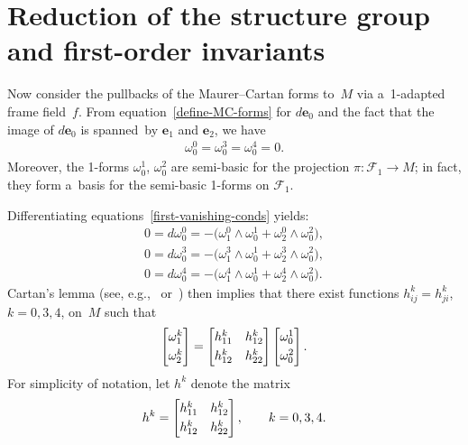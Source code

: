 \documentclass[pdftex]{sigma}
\numberwithin{equation}{section}
\theoremstyle{definition}
\begin{document}
\section{Reduction of the structure group and f\/irst-order invariants}\label{moving-frames-sec}

Now consider the pullbacks of the Maurer--Cartan forms to~$M$ via a~1-adapted frame f\/ield~$f$.
From equation~\eqref{define-MC-forms} for $d\mathbf{e}_0$ and the fact that the image of $d\mathbf{e}_0$ is spanned~by
$\mathbf{e}_1$ and $\mathbf{e}_2$, we have
\begin{gather}
\omega^0_0 = \omega^3_0 = \omega^4_0 = 0.
\label{first-vanishing-conds}
\end{gather}
Moreover, the 1-forms $\omega^1_0$, $\omega^2_0$ are semi-basic for the projection $\pi:\mathcal{F}_1 \to M$; in fact,
they form a~basis for the semi-basic 1-forms on $\mathcal{F}_1$.

Dif\/ferentiating equations~\eqref{first-vanishing-conds} yields:
\begin{gather*}
0 = d\omega^0_0 = -\big(\omega^0_1 \wedge \omega^1_0 + \omega^0_2 \wedge \omega^2_0\big),
\\
0 = d\omega^3_0 = -\big(\omega^3_1 \wedge \omega^1_0 + \omega^3_2 \wedge \omega^2_0\big),
\\
0 = d\omega^4_0 = -\big(\omega^4_1 \wedge \omega^1_0 + \omega^4_2 \wedge \omega^2_0\big).
\end{gather*}
Cartan's lemma (see, e.g.,~\cite{CFB} or~\cite{FTC}) then implies that there exist functions $h^k_{ij} = h^k_{ji}$, $k=0,3,4$, on~$M$ such that
\begin{gather*}
\begin{bmatrix}
\omega^k_1
\vspace{1mm}\\
\omega^k_2
\end{bmatrix}
=
\begin{bmatrix}
h^k_{11} & h^k_{12}
\vspace{1mm}\\
h^k_{12} & h^k_{22}
\end{bmatrix}
\begin{bmatrix}
\omega^1_0
\vspace{1mm}\\
\omega^2_0
\end{bmatrix}.
\end{gather*}
For simplicity of notation, let $h^k$ denote the matrix
\begin{gather*}
h^k =
\begin{bmatrix}
h^k_{11} & h^k_{12}
\vspace{1mm}\\
h^k_{12} & h^k_{22}
\end{bmatrix},
\qquad
k=0,3,4.
\end{gather*}
\end{document}
